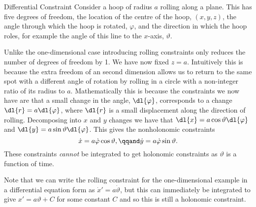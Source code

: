 \documentclass[fleqn]{NotesClass}
\begin{document}
    \begin{exm}{Differential Constraint}{}
        Consider a hoop of radius \(a\) rolling along a plane.
        This has five degrees of freedom, the location of the centre of the hoop, \((x, y, z)\), the angle through which the hoop is rotated, \(\varphi\), and the direction in which the hoop roles, for example the angle of this line to the \(x\)-axis, \(\vartheta\).
        
        Unlike the one-dimensional case introducing rolling constraints only reduces the number of degrees of freedom by 1.
        We have now fixed \(z = a\).
        Intuitively this is because the extra freedom of an second dimension allows us to return to the same spot with a different angle of rotation by rolling in a circle with a non-integer ratio of its radius to \(a\).
        Mathematically this is because the constraints we now have are that a small change in the angle, \(\dl{\varphi}\), corresponds to a change \(\dl{r} = a\dl{\varphi}\), where \(\dl{r}\) is a small displacement along the direction of rolling.
        Decomposing into \(x\) and \(y\) changes we have that \(\dl{x} = a\cos\vartheta\dl{\varphi}\) and \(\dl{y} = a\sin\vartheta\dl{\varphi}\).
        This gives the nonholonomic constraints
        \begin{equation}
            \dot{x} = a\dot{\varphi}\cos\vartheta, \qqand \dot{y} = a\dot{\varphi}\sin\vartheta.
        \end{equation}
        These constraints \emph{cannot} be integrated to get holonomic constraints as \(\vartheta\) is a function of time.
        
        Note that we can write the rolling constraint for the one-dimensional example in a differential equation form as \(\dot{x}' = a\dot{\vartheta}\), but this can immediately be integrated to give \(x' = a\vartheta + C\) for some constant \(C\) and so this is still a holonomic constraint.
    \end{exm}
\end{document}
